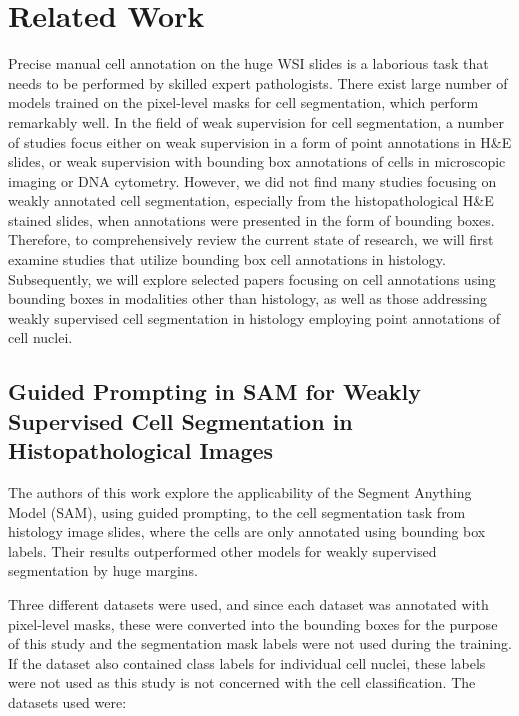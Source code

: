 \chapter{Related Work}
Precise manual cell annotation on the huge WSI slides is a laborious task that needs to be performed by skilled expert pathologists. There exist large number of models trained on the pixel-level masks for cell segmentation, which perform remarkably well. In the field of weak supervision for cell segmentation, a number of studies focus either on weak supervision in a form of point annotations in H\&E slides, or weak supervision with bounding box annotations of cells in microscopic imaging or DNA cytometry. However, we did not find many studies focusing on weakly annotated cell segmentation, especially from the histopathological H\&E stained slides, when annotations were presented in the form of bounding boxes. Therefore, to comprehensively review the current state of research, we will first examine studies that utilize bounding box cell annotations in histology. Subsequently, we will explore selected papers focusing on cell annotations using bounding boxes in modalities other than histology, as well as those addressing weakly supervised cell segmentation in histology employing point annotations of cell nuclei.


\section{Guided Prompting in SAM for Weakly Supervised Cell Segmentation in Histopathological Images \cite{Tyagi2023}}
The authors of this work explore the applicability of the Segment Anything Model (SAM), using guided prompting, to the cell segmentation task from histology image slides, where the cells are only annotated using bounding box labels. Their results outperformed other models for weakly supervised segmentation by huge margins.

Three different datasets were used, and since each dataset was annotated with pixel-level masks, these were converted into the bounding boxes for the purpose of this study and the segmentation mask labels were not used during the training. If the dataset also contained class labels for individual cell nuclei, these labels were not used as this study is not concerned with the cell classification. The datasets used were: 

